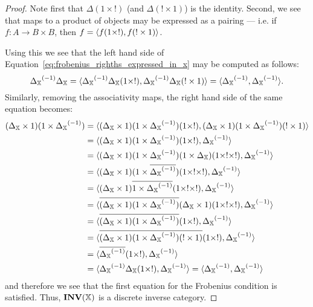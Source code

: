 \begin{proof}
  Note first that $\Delta(1 \times !)$ (and $\Delta(!\times 1)$) is the identity. Second, we see
  that maps to a product of objects may be expressed as a pairing --- i.e.  if
  $f:A \to B \times B$, then $f = \langle f(1\times !), f(!\times 1)\rangle$.

  Using this we see that the left hand side of Equation~\ref{eq:frobenius_righths_expressed_in_x}
  may be computed as follows:
  \[
    {\Delta_{\mathbb{X}}}^{(-1)} \Delta_{\mathbb{X}}
       = \langle{\Delta_{\ensuremath{\mathbb{X}}}}^{(-1)} \Delta_{\mathbb{X}}(1\times !), {\Delta_{\mathbb{X}}}^{(-1)} \Delta_{\mathbb{X}} (! \times 1)\rangle
    = \langle{\Delta_{\ensuremath{\mathbb{X}}}}^{(-1)}, {\Delta_{\mathbb{X}}}^{(-1)} \rangle.
  \]
  Similarly, removing the associativity maps, the right hand side of the same equation becomes:
  \begin{align*}
    (\Delta_{\X} \times 1) (1\times\inv{\Delta_{\X}}) &
      = \<(\Delta_{\X} \times 1) (1\times\inv{\Delta_{\X}}) (1\times !),
      (\Delta_{\X} \times 1) (1\times\inv{\Delta_{\X}}) (! \times 1 )\> \\
    &= \<(\Delta_{\X} \times 1) (1\times\inv{\Delta_{\X}}) (1\times ! ), \inv{\Delta_{\X}}\> \\
    &= \<(\Delta_{\X} \times 1) (1\times\inv{\Delta_{\X}}) (1 \times \Delta_{\X})(1\times !\times !), \inv{\Delta_{\X}}\> \\
    &= \<(\Delta_{\X} \times 1) (1\times\rst{\inv{\Delta_{\X}}}) (1\times !\times !), \inv{\Delta_{\X}}\> \\
    &= \<(\Delta_{\X} \times 1) \rst{1\times\inv{\Delta_{\X}}} (1\times !\times !), \inv{\Delta_{\X}}\> \\
    &= \<\rst{(\Delta_{\X} \times 1) (1\times\inv{\Delta_{\X}})}
      (\Delta_{\X} \times 1)(1\times !\times !), \inv{\Delta_{\X}}\> \\ %
    &= \<\rst{(\Delta_{\X} \times 1) (1\times\inv{\Delta_{\X}})} (1\times !), \inv{\Delta_{\X}}\> \\
      &= \<\rst{(\Delta_{\X} \times 1) (1\times\inv{\Delta_{\X}})(! \times 1)} (1\times !),
      \inv{\Delta_{\X}}\> \\ %
    &= \<\rst{\inv{\Delta_{\X}}} (1\times !), \inv{\Delta_{\X}}\> \\
    &= \<\inv{\Delta_{\X}}\Delta_{\X}(1\times !), \inv{\Delta_{\X}}\> = \<\inv{\Delta_{\X}}, \inv{\Delta_{\X}}\>
  \end{align*}
  and therefore we see that the first equation for the Frobenius condition is satisfied. Thus,
  $\mathbf{INV}({\mathbb{X}})$ is a discrete inverse category.
\end{proof}

